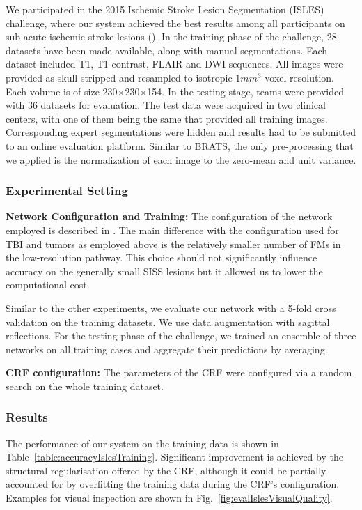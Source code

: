 We participated in the 2015 Ischemic Stroke Lesion Segmentation (ISLES) challenge, where our system achieved the best results among all participants on sub-acute ischemic stroke lesions (\cite{maier2017isles}). In the training phase of the challenge, 28 datasets have been made available, along with manual segmentations. Each dataset included T1, T1-contrast, FLAIR and DWI sequences. All images were provided as skull-stripped and resampled to isotropic $1mm^3$ voxel resolution. Each volume is of size 230$\times$230$\times$154. In the testing stage, teams were provided with 36 datasets for evaluation. The test data were acquired in two clinical centers, with one of them being the same that provided all training images. Corresponding expert segmentations were hidden and results had to be submitted to an online evaluation platform. Similar to BRATS, the only pre-processing that we applied is the normalization of each image to the zero-mean and unit variance.

\subsubsection{Experimental Setting}

\textbf{Network Configuration and Training:} The configuration of the network employed is described in \cite{kamnitsas2015Isles}. The main difference with the configuration used for TBI and tumors as employed above is the relatively smaller number of FMs in the low-resolution pathway. This choice should not significantly influence accuracy on the generally small SISS lesions but it allowed us to lower the computational cost.

Similar to the other experiments, we evaluate our network with a 5-fold cross validation on the training datasets. We use data augmentation with sagittal reflections. For the testing phase of the challenge, we trained an ensemble of three networks on all training cases and aggregate their predictions by averaging.

\textbf{CRF configuration:} The parameters of the CRF were configured via a random search on the whole training dataset.

\subsubsection{Results}
\label{subsubsec:resIsles2015}

The performance of our system on the training data is shown in Table~\ref{table:accuracyIslesTraining}. Significant improvement is achieved by the structural regularisation offered by the CRF, although it could be partially accounted for by overfitting the training data during the CRF's configuration. Examples for visual inspection are shown in Fig.~\ref{fig:evalIslesVisualQuality}.

